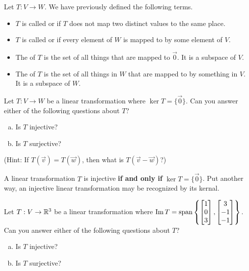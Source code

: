 
\begin{applicationActivities}{3}{19}

\begin{observation}
Let $T: V \rightarrow W$.  We have previously defined the following
terms.
\begin{itemize}
\item  $T$ is called  or  if $T$ does not map two distinct values to the same place.
\item $T$ is called  or  if every element of $W$ is mapped to by some element of $V$.
\item The  of $T$ is the set of all things that are mapped to $\vec{0}$.  It is a subspace of $V$.
\item The  of $T$ is the set of all things in $W$ that are mapped to by something in $V$.  It is a subspace of $W$.
\end{itemize}
\end{observation}

\begin{activity}{5}
Let $T: V \rightarrow W$ be a linear transformation where
$\ker T = \{ \vec{0} \}$. Can you answer either of the following questions
about \(T\)?
\begin{enumerate}[(a)]
\item Is $T$ injective?
\item Is $T$ surjective?
\end{enumerate}
(Hint: If $T(\vec{v})=T(\vec{w})$, then what is $T(\vec{v}-\vec{w})$?)
\end{activity}

\begin{fact}
A linear transformation $T$ is injective \textbf{if and only if} $\ker T = \{\vec{0}\}$. Put another way, an injective linear transformation may be
recognized by its  kernal.
\end{fact}

\begin{activity}{5}
Let $T: V \rightarrow \mathbb{R}^3$ be a linear transformation where
$\operatorname{Im} T = \operatorname{span} \left\{ \begin{bmatrix} 1 \\ 0 \\ 3 \end{bmatrix}, \begin{bmatrix} 3 \\ -1 \\ -1 \end{bmatrix} \right\}$.
Can you answer either of the following questions about \(T\)?
\begin{enumerate}[(a)]
\item Is $T$ injective?
\item Is $T$ surjective?
\end{enumerate}
\end{activity}


\end{applicationActivities}
